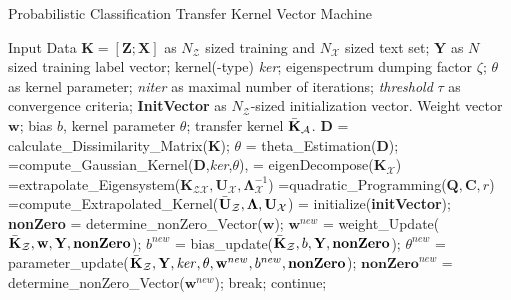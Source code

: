 \begin{algorithm}[!]
	\caption{Probabilistic Classification Transfer Kernel Vector Machine }\label{PCTKVMComplete}
	\begin{algorithmic}[1]
		\Require Input Data $\mathbf{K} = [\mathbf{Z};\mathbf{X}]$ as $N_\mathcal{Z}$ sized training and $N_\mathcal{X}$ sized text set; $\mathbf{Y}$ as $N$ sized training label vector; kernel(-type) \textit{ker}; eigenspectrum dumping factor $\zeta$; $\theta$ as kernel parameter; \textit{niter} as maximal number of iterations; \textit{threshold} $\tau$ as convergence criteria; \textbf{InitVector} as $N_\mathcal{Z}$-sized initialization vector.
		\Ensure Weight vector $\mathbf{w}$; bias $b$, kernel parameter $\theta$; transfer kernel $\bar{\mathbf{K}}_\mathcal{A}$.
		\State $\mathbf{D}$ = calculate\_Dissimilarity\_Matrix($\mathbf{K}$);
		\State $\theta$ = theta\_Estimation($\mathbf{D}$);  
		\EndIf
		=compute\_Gaussian\_Kernel($\mathbf{D}$,\textit{ker},$\theta$),
		= eigenDecompose($\mathbf{K}_\mathcal{X}$)  
		 =extrapolate\_Eigensystem($\mathbf{K}_\mathcal{ZX},\mathbf{U}_\mathcal{X},\boldsymbol{\Lambda}_\mathcal{X}^{-1}$) 
		\State [$\boldsymbol{\Lambda}$]=quadratic\_Programming($\mathbf{Q},\mathbf{C},r$)  
		=compute\_Extrapolated\_Kernel($\bar{\mathbf{U}}_\mathcal{Z},\boldsymbol{\Lambda},\mathbf{U}_\mathcal{X}$) 
		\State	[$\mathbf{w},b$] = initialize(\textbf{initVector});
		\State \textbf{nonZero} = determine\_nonZero\_Vector($\mathbf{w}$); 
		\State $\mathbf{w}^{new}$ = weight\_Update($\bar{\mathbf{K}}_{\mathcal{Z}},\mathbf{w,Y,nonZero}$);   
		\State $b^{new}$ = bias\_update($\bar{\mathbf{K}}_{\mathcal{Z}},b\mathbf{,Y,nonZero}$); 
		\State $\theta^{new}$ = parameter\_update($\bar{\mathbf{K}}_{\mathcal{Z}},\mathbf{Y},\mathit{ker},\theta,\mathbf{w}^{new},b^{new},\mathbf{nonZero}$); 
		\State $\mathbf{nonZero}^{new}$ = determine\_nonZero\_Vector($\mathbf{w}^{new}$);
		\State break;
		\Else
		\State continue;
		\EndIf
		\EndFor
	\end{algorithmic}
\end{algorithm}

